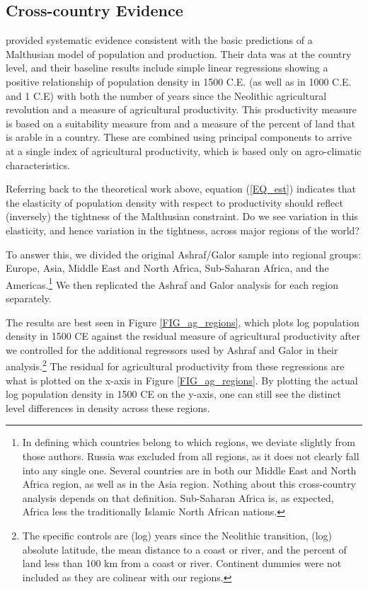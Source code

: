 \documentclass[11pt]{article}
\begin{document}
\subsection{Cross-country Evidence}
\citet{ashraf2010dynamics} provided systematic evidence consistent with the basic predictions of a Malthusian model of population and production. Their data was at the country level, and their baseline results include simple linear regressions showing a positive relationship of population density in 1500 C.E. (as well as in 1000 C.E. and 1 C.E) with both the number of years since the Neolithic agricultural revolution and a measure of agricultural productivity. This productivity measure is based on a suitability measure from \citet{ramankutty2002} and a measure of the percent of land that is arable in a country. These are combined using principal components to arrive at a single index of agricultural productivity, which is based only on agro-climatic characteristics.

Referring back to the theoretical work above, equation (\ref{EQ_est}) indicates that the elasticity of population density with respect to productivity should reflect (inversely) the tightness of the Malthusian constraint. Do we see variation in this elasticity, and hence variation in the tightness, across major regions of the world?

To answer this, we divided the original Ashraf/Galor sample into regional groups: Europe, Asia, Middle East and North Africa, Sub-Saharan Africa, and the Americas.\footnote{In defining which countries belong to which regions, we deviate slightly from those authors. Russia was excluded from all regions, as it does not clearly fall into any single one. Several countries are in both our Middle East and North Africa region, as well as in the Asia region. Nothing about this cross-country analysis depends on that definition. Sub-Saharan Africa is, as expected, Africa less the traditionally Islamic North African nations.} We then replicated the Ashraf and Galor analysis for each region separately.

The results are best seen in Figure \ref{FIG_ag_regions}, which plots log population density in 1500 CE against the residual measure of agricultural productivity after we controlled for the additional regressors used by Ashraf and Galor in their analysis.\footnote{The specific controls are (log) years since the Neolithic transition, (log) absolute latitude, the mean distance to a coast or river, and the percent of land less than 100 km from a coast or river. Continent dummies were not included as they are colinear with our regions.} The residual for agricultural productivity from these regressions are what is plotted on the x-axis in Figure \ref{FIG_ag_regions}. By plotting the actual log population density in 1500 CE on the y-axis, one can still see the distinct level differences in density across these regions.
\end{document}
